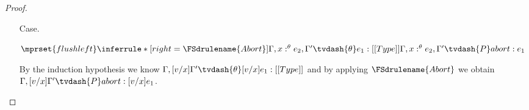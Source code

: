 \begin{proof}
\begin{itemize}

     
   \item[Case.]\ \\
     \begin{center}
       \begin{math}
         $$\mprset{flushleft}
         \inferrule* [right=\FSdrulename{Abort}] {
           \Gamma, x:^\theta e_2,\Gamma' \tvdash{\theta} e_1:[[Type]]
         }{\Gamma, x:^\theta e_2,\Gamma' \tvdash{P} abort:e_1}
       \end{math}
     \end{center}
     By the induction hypothesis we know 
     $\Gamma, [v/x]\Gamma' \tvdash{\theta} [v/x]e_1:[[Type]]$ and by applying
     $\FSdrulename{Abort}$ we obtain 
     $\Gamma, [v/x]\Gamma' \tvdash{P} abort:[v/x]e_1$.



\end{itemize}
\end{proof}
